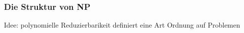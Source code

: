 \documentclass[onlymath]{beamer}
\begin{document}
\begin{frame}[t]\frametitle{Die Struktur von NP}
Idee: polynomielle Reduzierbarikeit definiert eine Art Ordnung auf Problemen

\vspace{1cm}
\begin{center}
%
%
%

\end{center}
\end{frame}
\end{document}
